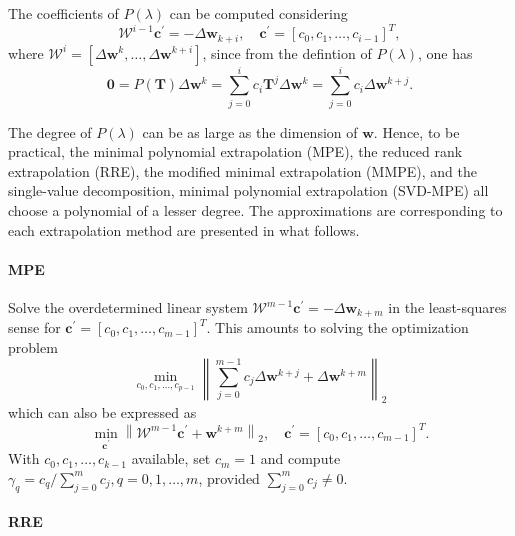 The coefficients of \(P(\lambda)\) can be computed considering
\begin{equation}
\mathscr W^{i-1} \mathbf c^{\prime}=-\Delta \mathbf w_{k+i}, \quad \mathbf c^{\prime}=\left[c_{0}, c_{1}, \ldots, c_{i-1}\right]^{T},
\end{equation}
where \(\mathscr W^i = [\Delta \mathbf w^k, \dots, \Delta \mathbf w^{k+i}]\), since from the defintion of \(P(\lambda)\), one has
\begin{equation}
  \mathbf 0 = P(\mathbf T) \Delta \mathbf w^k = \sum_{j=0}^i c_i \mathbf T^j \Delta \mathbf w^k = \sum_{j=0}^i c_i \Delta \mathbf w^{k+j}.
\end{equation}

The degree of \(P(\lambda)\) can be as large as the dimension of \(\mathbf w\).
Hence, to be practical, the minimal polynomial extrapolation (MPE), the reduced rank extrapolation (RRE), the modified minimal extrapolation (MMPE), and the single-value decomposition, minimal polynomial extrapolation (SVD-MPE) all choose a polynomial of a lesser degree.
The approximations are corresponding to each extrapolation method are presented in what follows.

\paragraph{MPE}

Solve the overdetermined linear system \(\mathscr W^{m-1} \mathbf c^{\prime}=-\Delta \mathbf w_{k+m}\) in the least-squares sense for \(\mathbf c^{\prime}=\left[c_{0}, c_{1}, \ldots, c_{m-1}\right]^{T}\).
This amounts to solving the optimization problem
\begin{equation}
\min _{c_{0}, c_{1}, \ldots, c_{p-1}}\left\|\sum_{j=0}^{m-1} c_{j} \Delta \mathbf w^ {k+j}+\Delta \mathbf w^{k+m}\right\|_2
\end{equation}
which can also be expressed as
\begin{equation}
  \min _{\mathbf c^{\prime}}\left\|\mathscr W^{m-1} \mathbf c^{\prime}+\mathbf w^{k+m}\right\|_2, \quad \mathbf c^{\prime}=\left[c_{0}, c_{1}, \ldots, c_{m-1}\right]^{T} .
\end{equation}
With \(c_{0}, c_{1}, \ldots, c_{k-1}\) available, set \(c_{m}=1\) and compute \(\gamma_{q}=c_{q} / \sum_{j=0}^{m} c_{j}, q=0,1, \ldots, m\), provided \(\sum_{j=0}^{m} c_{j} \neq 0\).

\paragraph{RRE}

